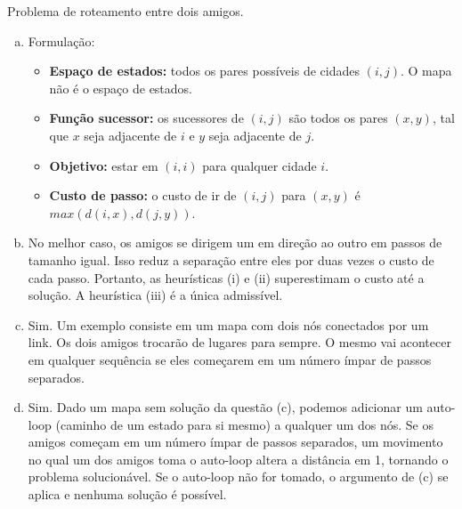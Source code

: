\begin{solution}
Problema de roteamento entre dois amigos.
	\begin{enumerate}[a.]
		\item Formulação:
		\begin{itemize}
			\item \textbf{Espaço de estados:} todos os pares possíveis de cidades $(i, j)$. O mapa não é o espaço de estados.
			
			\item \textbf{Função sucessor:} os sucessores de $(i, j)$ são todos os pares $(x, y)$, tal que $x$ seja adjacente de $i$ e $y$ seja adjacente de $j$.
			
			\item \textbf{Objetivo:} estar em $(i, i)$ para qualquer cidade $i$.
			
			\item \textbf{Custo de passo:} o custo de ir de $(i, j)$ para $(x, y)$ é $max(d(i, x), d(j, y))$.
		\end{itemize}
	
		\item No melhor caso, os amigos se dirigem um em direção ao outro em passos de tamanho igual. Isso reduz a separação entre eles por duas vezes o custo de cada passo. Portanto, as heurísticas (i) e (ii) superestimam o custo até a solução. A heurística (iii) é a única admissível.
	
		\item Sim. Um exemplo consiste em um mapa com dois nós conectados por um link. Os dois amigos trocarão de lugares para sempre. O mesmo vai acontecer em qualquer sequência se eles começarem em um número ímpar de passos separados.
	
		\item Sim. Dado um mapa sem solução da questão (c), podemos adicionar um auto-loop (caminho de um estado para si mesmo) a qualquer um dos nós. Se os amigos começam em um número ímpar de passos separados, um movimento no qual um dos amigos toma o auto-loop altera a distância em 1, tornando o problema solucionável. Se o auto-loop não for tomado, o argumento de (c) se aplica e nenhuma solução é possível.
	\end{enumerate}
\end{solution}

